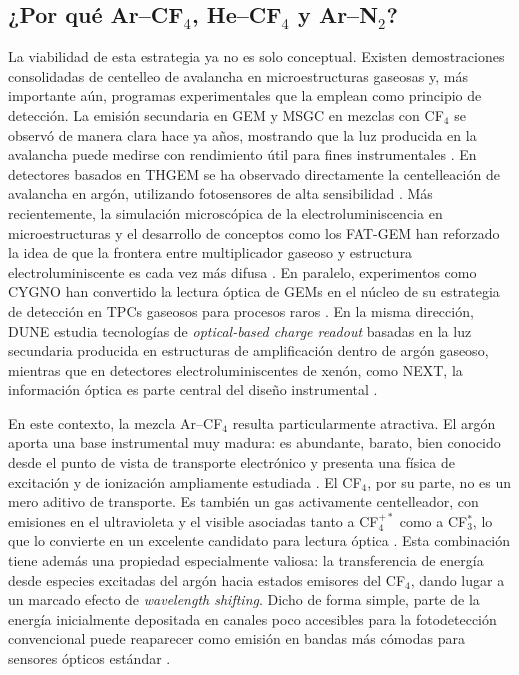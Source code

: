 \documentclass[12pt,a4paper]{article}
\begin{document}
\subsection{¿Por qué Ar--CF$_4$, He--CF$_4$ y Ar--N$_2$?}

La viabilidad de esta estrategia ya no es solo conceptual. Existen demostraciones consolidadas de centelleo de avalancha en microestructuras gaseosas y, más importante aún, programas experimentales que la emplean como principio de detección. La emisión secundaria en GEM y MSGC en mezclas con CF$_4$ se observó de manera clara hace ya años, mostrando que la luz producida en la avalancha puede medirse con rendimiento útil para fines instrumentales \cite{fraga2003the,morozov2012secondary}. En detectores basados en THGEM se ha observado directamente la centelleación de avalancha en argón, utilizando fotosensores de alta sensibilidad \cite{bondara2010direct}. Más recientemente, la simulación microscópica de la electroluminiscencia en microestructuras y el desarrollo de conceptos como los FAT-GEM han reforzado la idea de que la frontera entre multiplicador gaseoso y estructura electroluminiscente es cada vez más difusa \cite{oliveira2012simulation,williams2024fatgems}. En paralelo, experimentos como CYGNO han convertido la lectura óptica de GEMs en el núcleo de su estrategia de detección en TPCs gaseosos para procesos raros \cite{torelli2022the}. En la misma dirección, DUNE estudia tecnologías de \emph{optical-based charge readout} basadas en la luz secundaria producida en estructuras de amplificación dentro de argón gaseoso, mientras que en detectores electroluminiscentes de xenón, como NEXT, la información óptica es parte central del diseño instrumental \cite{hayrapetyan2024dune,next2014present}.

En este contexto, la mezcla Ar--CF$_4$ resulta particularmente atractiva. El argón aporta una base instrumental muy madura: es abundante, barato, bien conocido desde el punto de vista de transporte electrónico y presenta una física de excitación y de ionización ampliamente estudiada \cite{zatsarinny2013comparisons,biagi1999monte}. El CF$_4$, por su parte, no es un mero aditivo de transporte. Es también un gas activamente centelleador, con emisiones en el ultravioleta y el visible asociadas tanto a CF$_4^{+*}$ como a CF$_3^*$, lo que lo convierte en un excelente candidato para lectura óptica \cite{washida1983emission,morozov2010photon,lehaut2015scintillation}. Esta combinación tiene además una propiedad especialmente valiosa: la transferencia de energía desde especies excitadas del argón hacia estados emisores del CF$_4$, dando lugar a un marcado efecto de \emph{wavelength shifting}. Dicho de forma simple, parte de la energía inicialmente depositada en canales poco accesibles para la fotodetección convencional puede reaparecer como emisión en bandas más cómodas para sensores ópticos estándar \cite{amedo2023observation,gonzlezdaz2024primary,veenhof2025primary}.
\end{document}
